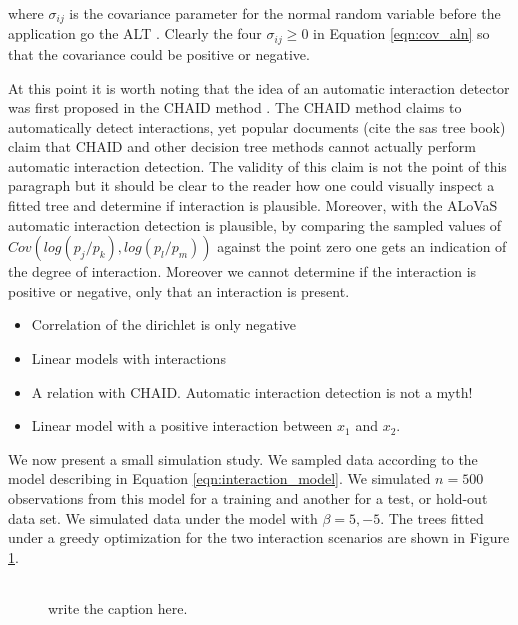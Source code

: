 where $\sigma_{ij}$ is the covariance parameter for the normal random variable before the application go the ALT \cite{}. Clearly the four $\sigma_{ij} \geq 0$ in Equation \ref{eqn:cov_aln} so that the covariance could be positive or negative.  

At this point it is worth noting that the idea of an automatic interaction detector was first proposed in the CHAID method \cite{}. The CHAID method claims to automatically detect interactions, yet popular documents \cite{} (cite the sas tree book) claim that CHAID and other decision tree methods cannot actually perform automatic interaction detection. The validity of this claim is not the point of this paragraph but it should be clear to the reader how one could visually inspect a fitted tree and determine if interaction is plausible. Moreover, with the ALoVaS automatic interaction detection is plausible, by comparing the sampled values of $Cov(log(p_j/p_k), log(p_l/p_m) )$  against the point zero one gets an indication of the degree of interaction. Moreover we cannot determine if the interaction is positive or negative, only that an interaction is present. 

\begin{itemize}
\item Correlation of the dirichlet is only negative  
\item Linear models with interactions  
\item A relation with CHAID. Automatic interaction detection is not a myth! 
\item Linear model with a positive interaction between $x_1$ and $x_2$. 
\end{itemize}

We now present a small simulation study. We sampled data according to the model describing in Equation \ref{eqn:interaction_model}. We simulated $n=500$ observations from this model for a training and another for a test, or hold-out data set. We simulated data under the model with $\beta =5, -5$. The trees fitted under a greedy optimization for the two interaction scenarios are shown in Figure \ref{fig:interaction_trees}. 

\begin{figure}
\begin{center} 
\begin{tabular}{cc}
\end{tabular}
\caption{write the caption here.}
\label{fig:interaction_trees}
\end{center}
\end{figure} 

